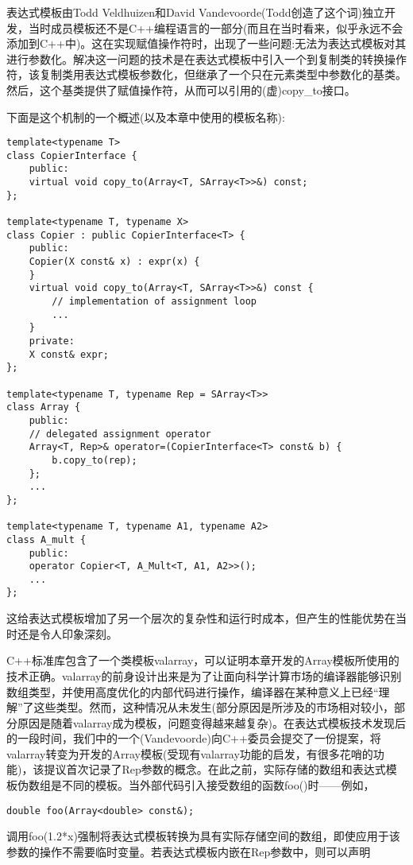 表达式模板由Todd Veldhuizen和David Vandevoorde(Todd创造了这个词)独立开发，当时成员模板还不是C++编程语言的一部分(而且在当时看来，似乎永远不会添加到C++中)。这在实现赋值操作符时，出现了一些问题:无法为表达式模板对其进行参数化。解决这一问题的技术是在表达式模板中引入一个到复制类的转换操作符，该复制类用表达式模板参数化，但继承了一个只在元素类型中参数化的基类。然后，这个基类提供了赋值操作符，从而可以引用的(虚)copy\_to接口。

下面是这个机制的一个概述(以及本章中使用的模板名称):

\begin{lstlisting}[style=styleCXX]
template<typename T>
class CopierInterface {
	public:
	virtual void copy_to(Array<T, SArray<T>>&) const;
};

template<typename T, typename X>
class Copier : public CopierInterface<T> {
	public:
	Copier(X const& x) : expr(x) {
	}
	virtual void copy_to(Array<T, SArray<T>>&) const {
		// implementation of assignment loop
		...
	}
	private:
	X const& expr;
};

template<typename T, typename Rep = SArray<T>>
class Array {
	public:
	// delegated assignment operator
	Array<T, Rep>& operator=(CopierInterface<T> const& b) {
		b.copy_to(rep);
	};
	...
};

template<typename T, typename A1, typename A2>
class A_mult {
	public:
	operator Copier<T, A_Mult<T, A1, A2>>();
	...
};
\end{lstlisting}

这给表达式模板增加了另一个层次的复杂性和运行时成本，但产生的性能优势在当时还是令人印象深刻。

C++标准库包含了一个类模板valarray，可以证明本章开发的Array模板所使用的技术正确。valarray的前身设计出来是为了让面向科学计算市场的编译器能够识别数组类型，并使用高度优化的内部代码进行操作，编译器在某种意义上已经“理解”了这些类型。然而，这种情况从未发生(部分原因是所涉及的市场相对较小，部分原因是随着valarray成为模板，问题变得越来越复杂)。在表达式模板技术发现后的一段时间，我们中的一个(Vandevoorde)向C++委员会提交了一份提案，将valarray转变为开发的Array模板(受现有valarray功能的启发，有很多花哨的功能)，该提议首次记录了Rep参数的概念。在此之前，实际存储的数组和表达式模板伪数组是不同的模板。当外部代码引入接受数组的函数foo()时——例如，

\begin{lstlisting}[style=styleCXX]
double foo(Array<double> const&);
\end{lstlisting}

调用foo(1.2*x)强制将表达式模板转换为具有实际存储空间的数组，即使应用于该参数的操作不需要临时变量。若表达式模板内嵌在Rep参数中，则可以声明

